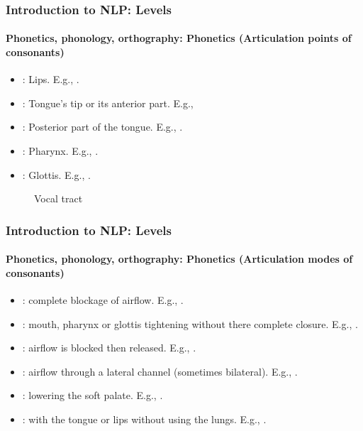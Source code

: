 \documentclass[xcolor=table]{beamer}
\begin{document}
\begin{frame}
\frametitle{Introduction to NLP: Levels}
\framesubtitle{Phonetics, phonology, orthography: Phonetics (Articulation points of consonants)}

\begin{minipage}{0.55\textwidth}
\begin{itemize}
	\item {}: Lips. E.g., \expword{\textipa{[b], [p], [m], [f], [v]}}.
	\item {}: Tongue's tip or its anterior part. 
	E.g., 
	\item {}: Posterior part of the tongue. E.g., .
	\item {}: Pharynx. 
	E.g., .
	\item {}: Glottis. 
	E.g., .
\end{itemize}
\end{minipage}
\begin{minipage}{0.43\textwidth}
	\begin{figure}
		\caption{Vocal tract \cite{2009-ball}}
	\end{figure}
\end{minipage}

\end{frame}

\begin{frame}
\frametitle{Introduction to NLP: Levels}
\framesubtitle{Phonetics, phonology, orthography: Phonetics (Articulation modes of consonants)}

\begin{itemize}
	\item {}: complete blockage of airflow.
	E.g., \expword{\textipa{[p], [k], [b], [m], [n]}}.
	
	\item {}: mouth, pharynx or glottis tightening without there complete closure.
	E.g., \expword{\textipa{[f], [v], [s]}}.
	
	\item {}: airflow is blocked then released.
	E.g., \expword{\textipa{[\t{\textteshlig}]}}.
	
	\item {}: airflow through a lateral channel (sometimes bilateral).
	E.g., \expword{\textipa{[l]}}.
	
	\item {}: lowering the soft palate.
	E.g., \expword{\textipa{[m], [n]}}.
	
	\item {}: with the tongue or lips without using the lungs.
	E.g., .
	
\end{itemize}

\end{frame}
\end{document}
